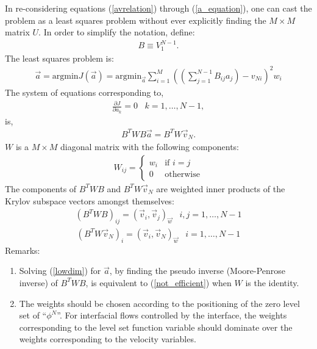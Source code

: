 \documentclass[]{article}
\begin{document}
In re-considering equations (\ref{avrelation}) through (\ref{a_equation}), 
one can cast the problem as a least squares problem without ever explicitly
finding the $M\times M$ matrix $U$.  In order to simplify the notation, define:
\begin{eqnarray}
	B \equiv V_{1}^{N-1}.
\end{eqnarray}
The least squares problem is:
\begin{eqnarray}
	\vec{a}=\mbox{argmin} J(\vec{a})=
	\mbox{argmin}_{\vec{a}} \sum_{i=1}^{M}\left(
	(\sum_{j=1}^{N-1}B_{ij}a_{j})-v_{Ni}\right)^{2}w_{i}
\end{eqnarray}
The system of equations corresponding to,
\begin{eqnarray}
	\frac{\partial J}{\partial a_{k}}=0 \hspace{10pt} k=1,\ldots,N-1,
\end{eqnarray}
is,
\begin{eqnarray}
	B^{T}WB\vec{a}=B^{T}W\vec{v}_{N}. \label{lowdim}
\end{eqnarray}
$W$ is a $M\times M$ diagonal matrix with the following components:
\begin{eqnarray}
	W_{ij}=\left\{ \begin{array}{cc}
		w_{i} & \mbox{if $i=j$} \\
	0 & \mbox{otherwise} \end{array}
	\right.
\end{eqnarray}
The components of $B^{T}WB$ and $B^{T}W\vec{v}_{N}$ are weighted
inner products of the Krylov subspace vectors amongst 
themselves:
\begin{eqnarray}
	(B^{T}WB)_{ij}=(\vec{v}_{i},\vec{v}_{j})_{\vec{w}} \hspace{10pt} 
	i,j=1,\ldots,N-1
\end{eqnarray}
\begin{eqnarray}
	(B^{T}W\vec{v}_{N})_{i}=(\vec{v}_{i},\vec{v}_{N})_{\vec{w}} 
	\hspace{10pt} i=1,\ldots,N-1
\end{eqnarray}
Remarks:
\begin{enumerate}
	\item Solving (\ref{lowdim}) for $\vec{a}$,
		by finding the pseudo inverse (Moore-Penrose inverse)
		of
		$B^{T}WB$, is equivalent to (\ref{not_efficient})
		when $W$ is the identity.
	\item The weights should be chosen according to the positioning
		of the zero
		level set of ``$\phi^{N}$''. For interfacial
		flows controlled by the interface, the weights corresponding
		to the level set function variable should dominate over
		the weights corresponding to the velocity variables.
\end{enumerate}
\end{document}
